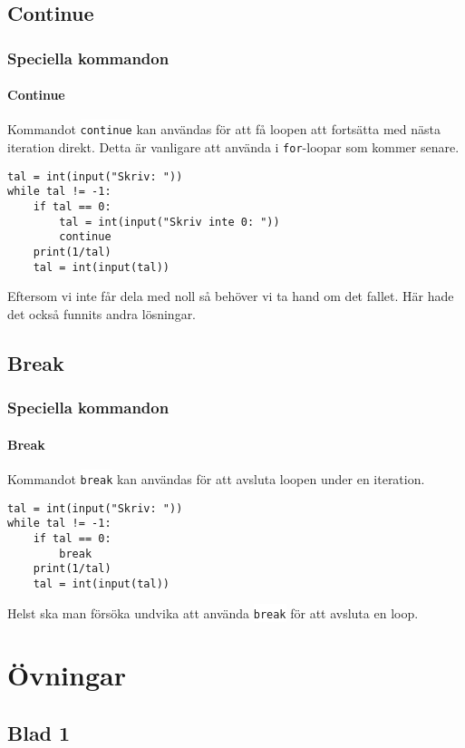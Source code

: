 \documentclass[aspectratio=169]{beamer}
\newcommand{\code}[1]{\colorbox{white}{\lstinline{#1}}}
\begin{document}
\subsection{Continue}

\begin{frame}[fragile]
	\frametitle{Speciella kommandon}
	\framesubtitle{Continue}
	
	Kommandot \code{continue} kan användas för att få loopen att fortsätta med nästa iteration direkt. Detta är vanligare att använda i \code{for}-loopar som kommer senare.
	
	\begin{lstlisting}
tal = int(input("Skriv: "))
while tal != -1:
    if tal == 0:
        tal = int(input("Skriv inte 0: "))
        continue
    print(1/tal)
    tal = int(input(tal))
	\end{lstlisting}

	Eftersom vi inte får dela med noll så behöver vi ta hand om det fallet. Här hade det också funnits andra lösningar.
	
\end{frame}


\subsection{Break}

\begin{frame}[fragile]
	\frametitle{Speciella kommandon}
	\framesubtitle{Break}
	
	Kommandot \code{break} kan användas för att avsluta loopen under en iteration.
	
	\begin{lstlisting}
tal = int(input("Skriv: "))
while tal != -1:
    if tal == 0:
        break
    print(1/tal)
    tal = int(input(tal))
	\end{lstlisting}

	Helst ska man försöka undvika att använda \code{break} för att avsluta en loop.
	
\end{frame}


\section{Övningar}

\subsection{Blad 1}
\end{document}
